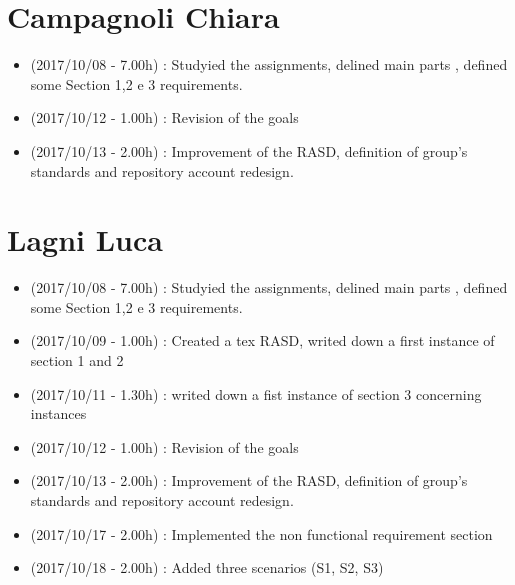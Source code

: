 \documentclass[a4paper]{book}
\begin{document}
\section{Campagnoli Chiara}
\begin{itemize}
\item (2017/10/08 - 7.00h) : Studyied the assignments, delined main parts , defined some Section 1,2 e 3 requirements.
\item (2017/10/12 - 1.00h) : Revision of the goals 
\item (2017/10/13 - 2.00h) : Improvement of the RASD, definition of group's standards and repository account redesign.
\end{itemize}

\section{Lagni Luca}
\begin{itemize}
\item (2017/10/08 - 7.00h) : Studyied the assignments, delined main parts , defined some Section 1,2 e 3 requirements.
\item (2017/10/09 - 1.00h) : Created a tex RASD, writed down a first instance of section 1 and 2
\item (2017/10/11 - 1.30h) : writed down a fist instance of section 3 concerning instances
\item (2017/10/12 - 1.00h) : Revision of the goals 
\item (2017/10/13 - 2.00h) : Improvement of the RASD, definition of group's standards and repository account redesign.
\item (2017/10/17 - 2.00h) : Implemented the non functional requirement section
\item (2017/10/18 - 2.00h) : Added three scenarios (S1, S2, S3)
\end{itemize}
\end{document}
